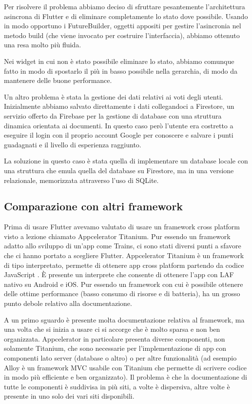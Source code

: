 Per risolvere il problema abbiamo deciso di sfruttare pesantemente l'architettura asincrona di Flutter e di eliminare completamente lo stato dove possibile.
Usando in modo opportuno i FutureBuilder, oggetti appositi per gestire l'asincronia nel metodo build (che viene invocato per costruire l'interfaccia), abbiamo ottenuto una resa molto più fluida.

Nei widget in cui non è stato possibile eliminare lo stato, abbiamo comunque fatto in modo di spostarlo il più in basso possibile nella gerarchia, di modo da mantenere delle buone performance.

Un altro problema è stata la gestione dei dati relativi ai voti degli utenti.
Inizialmente abbiamo salvato direttamente i dati collegandoci a Firestore, un servizio offerto da Firebase per la gestione di database con una struttura dinamica orientata ai documenti.
In questo caso però l'utente era costretto a eseguire il login con il proprio account Google per conoscere e salvare i punti guadagnati e il livello di esperienza raggiunto.

La soluzione in questo caso è stata quella di implementare un database locale con una struttura che emula quella del database su Firestore, ma in una versione relazionale, memorizzata attraverso l'uso di SQLite.

\subsection{Comparazione con altri framework\label{sec:flutter-comparazione}}

Prima di usare Flutter avevamo valutato di usare un framework cross platform visto a lezione chiamato Appcelerator Titanium.
Pur essendo un framework adatto allo sviluppo di un'app come Trains, ci sono stati diversi punti a sfavore che ci hanno portato a scegliere Flutter.
Appcelerator Titanium è un framework di tipo interpretato, permette di ottenere app cross platform partendo da codice JavaScript \parencite{gaggi:framework}.
È presente un interprete che consente di ottenere l'app con LAF nativo su Android e iOS.
Pur essendo un framework con cui è possibile ottenere delle ottime performance (basso consumo di risorse e di batteria), ha un grosso punto debole relativo alla documentazione.

A un primo sguardo è presente molta documentazione relativa al framework, ma una volta che si inizia a usare ci si accorge che è molto sparsa e non ben organizzata.
Appcelerator in particolare presenta diverse componenti, non solamente Titanium, che sono necessarie per l'implementazione di app con componenti lato server (database o altro) o per altre funzionalità (ad esempio Alloy è un framework MVC usabile con Titanium che permette di scrivere codice in modo più efficiente e ben organizzato).
Il problema è che la documentazione di tutte le componenti è suddivisa in più siti, a volte è dispersiva, altre volte è presente in uno solo dei vari siti disponibili.

